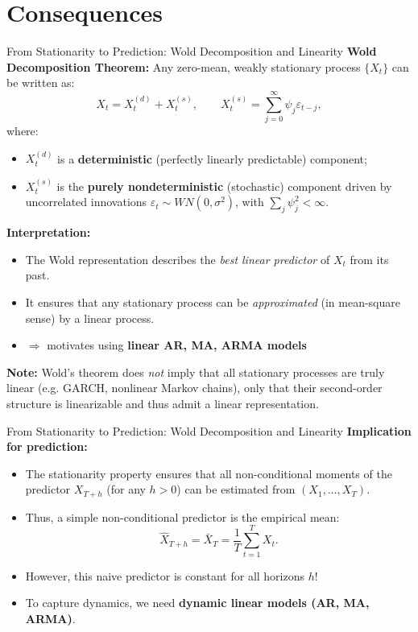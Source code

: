 \documentclass{beamer}
\begin{document}
% 


\section{Consequences}
\begin{frame}{From Stationarity to Prediction: Wold Decomposition and Linearity}
\small
\textbf{Wold Decomposition Theorem:}  
Any zero-mean, weakly stationary process $\{X_t\}$ can be written as:
\[
X_t = X_t^{(d)} + X_t^{(s)}, \qquad
X_t^{(s)} = \sum_{j=0}^{\infty} \psi_j \varepsilon_{t-j},
\]
where:
\begin{itemize}
    \item $X_t^{(d)}$ is a \textbf{deterministic} (perfectly linearly predictable) component;
    \item $X_t^{(s)}$ is the \textbf{purely nondeterministic} (stochastic) component driven by uncorrelated innovations
          $\varepsilon_t \sim WN(0,\sigma^2)$, with $\sum_j \psi_j^2 < \infty$.
\end{itemize}

\pause
\textbf{Interpretation:}
\begin{itemize}
    \item The Wold representation describes the \emph{best linear predictor} of $X_t$ from its past.
    \item It ensures that any stationary process can be \emph{approximated} (in mean-square sense)
          by a linear process.
    \item $\Rightarrow$ motivates using \textbf{linear AR, MA, ARMA models} 
\end{itemize}

\textbf{Note:}  
Wold’s theorem does \emph{not} imply that all stationary processes are truly linear (e.g. GARCH, nonlinear Markov chains), only that their second-order structure is linearizable and thus admit a linear representation.
\end{frame}



\begin{frame}{From Stationarity to Prediction: Wold Decomposition and Linearity}
\textbf{Implication for prediction:}
\begin{itemize}
    \item The stationarity property ensures that all non-conditional moments of the predictor $X_{T+h}$  
    (for any $h>0$) can be estimated from $(X_1, \ldots, X_T)$.
    \item Thus, a simple non-conditional predictor is the empirical mean:
    \[
    \hat X_{T+h} = \bar X_T = \frac{1}{T}\sum_{t=1}^T X_t.
    \]
    \item However, this naive predictor is constant for all horizons $h$!
    \item To capture dynamics, we need \textbf{dynamic linear models (AR, MA, ARMA)}.
\end{itemize}
\end{frame}
\end{document}

